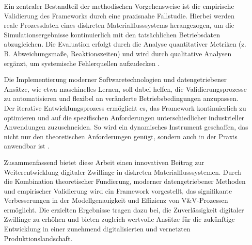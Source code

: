 Ein zentraler Bestandteil der methodischen Vorgehensweise ist die empirische Validierung des Frameworks durch eine praxisnahe Fallstudie. Hierbei werden reale Prozessdaten eines diskreten Materialflusssystems herangezogen, um die Simulationsergebnisse kontinuierlich mit den tatsächlichen Betriebsdaten abzugleichen. Die Evaluation erfolgt durch die Analyse quantitativer Metriken (z. B. Abweichungsmaße, Reaktionszeiten) und wird durch qualitative Analysen ergänzt, um systemische Fehlerquellen aufzudecken \parencite{Uhlemann2017}.

Die Implementierung moderner Softwaretechnologien und datengetriebener Ansätze, wie etwa maschinelles Lernen, soll dabei helfen, die Validierungsprozesse zu automatisieren und flexibel an veränderte Betriebsbedingungen anzupassen. Der iterative Entwicklungsprozess ermöglicht es, das Framework kontinuierlich zu optimieren und auf die spezifischen Anforderungen unterschiedlicher industrieller Anwendungen zuzuschneiden. So wird ein dynamisches Instrument geschaffen, das nicht nur den theoretischen Anforderungen genügt, sondern auch in der Praxis anwendbar ist \parencite{Tao2018, Kritzinger2018}.

Zusammenfassend bietet diese Arbeit einen innovativen Beitrag zur Weiterentwicklung digitaler Zwillinge in diskreten Materialflusssystemen. Durch die Kombination theoretischer Fundierung, moderner datengetriebener Methoden und empirischer Validierung wird ein Framework vorgestellt, das signifikante Verbesserungen in der Modellgenauigkeit und Effizienz von V\&V-Prozessen ermöglicht. Die erzielten Ergebnisse tragen dazu bei, die Zuverlässigkeit digitaler Zwillinge zu erhöhen und bieten zugleich wertvolle Ansätze für die zukünftige Entwicklung in einer zunehmend digitalisierten und vernetzten Produktionslandschaft.
